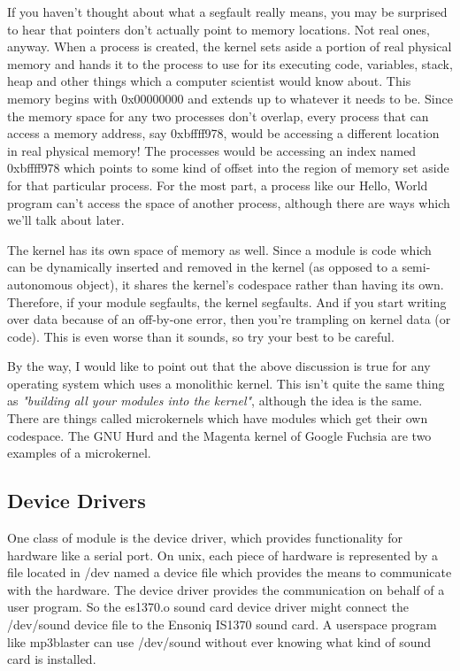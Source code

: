 \documentclass[11pt]{article}
\begin{document}
If you haven't thought about what a segfault really means, you may be surprised to hear that pointers don't actually point to memory locations. Not real ones, anyway. When a process is created, the kernel sets aside a portion of real physical memory and hands it to the process to use for its executing code, variables, stack, heap and other things which a computer scientist would know about. This memory begins with 0x00000000 and extends up to whatever it needs to be. Since the memory space for any two processes don't overlap, every process that can access a memory address, say 0xbffff978, would be accessing a different location in real physical memory! The processes would be accessing an index named 0xbffff978 which points to some kind of offset into the region of memory set aside for that particular process. For the most part, a process like our Hello, World program can't access the space of another process, although there are ways which we'll talk about later.

The kernel has its own space of memory as well. Since a module is code which can be dynamically inserted and removed in the kernel (as opposed to a semi-autonomous object), it shares the kernel's codespace rather than having its own. Therefore, if your module segfaults, the kernel segfaults. And if you start writing over data because of an off-by-one error, then you're trampling on kernel data (or code). This is even worse than it sounds, so try your best to be careful.

By the way, I would like to point out that the above discussion is true for any operating system which uses a monolithic kernel. This isn't quite the same thing as \emph{"building all your modules into the kernel"}, although the idea is the same. There are things called microkernels which have modules which get their own codespace. The GNU Hurd and the Magenta kernel of Google Fuchsia are two examples of a microkernel.

\subsection{Device Drivers}
\label{sec:org578c01b}
One class of module is the device driver, which provides functionality for hardware like a serial port. On unix, each piece of hardware is represented by a file located in /dev named a device file which provides the means to communicate with the hardware. The device driver provides the communication on behalf of a user program. So the es1370.o sound card device driver might connect the /dev/sound device file to the Ensoniq IS1370 sound card. A userspace program like mp3blaster can use /dev/sound without ever knowing what kind of sound card is installed.
\end{document}
